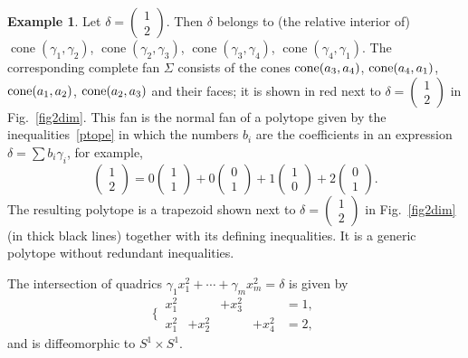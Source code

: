 \documentclass[a4paper]{amsart}
\theoremstyle{definition}
\newtheorem{example}[theorem]{Example}
\theoremstyle{remark}
\numberwithin{equation}{section}
\newcommand{\mb}[1]{{\textbf {\textit#1}}}
\def\cone{\mathop{\mathrm{cone}}}
\newcommand{\<}{\langle}
\renewcommand{\>}{\rangle}
\begin{document}
\begin{example}
Let $\delta=\begin{pmatrix}1\\2\end{pmatrix}$. Then $\delta$ belongs to (the relative interior of) $\cone(\gamma_1,\gamma_2)$, $\cone(\gamma_2,\gamma_3)$, $\cone(\gamma_3,\gamma_4)$, $\cone(\gamma_4,\gamma_1)$. The corresponding complete fan $\Sigma$ consists of the cones $\cone(\mb a_3,\mb a_4)$, $\cone(\mb a_4,\mb a_1)$, $\cone(\mb a_1,\mb a_2)$, $\cone(\mb a_2,\mb a_3)$ and their faces; it is shown in red next to $\delta=\begin{pmatrix}1\\2\end{pmatrix}$ in Fig.~\ref{fig2dim}. This fan is the normal fan of a polytope given by the inequalities~\eqref{ptope} in which the numbers $b_i$ are the coefficients in an expression $\delta=\sum b_i\gamma_i$, for example,
\[
  \begin{pmatrix}1\\2\end{pmatrix}=0\begin{pmatrix}1\\1\end{pmatrix}+
  0\begin{pmatrix}0\\1\end{pmatrix}+1\begin{pmatrix}1\\0\end{pmatrix}+
  2\begin{pmatrix}0\\1\end{pmatrix}.
\] 
The resulting polytope is a trapezoid shown next to $\delta=\begin{pmatrix}1\\2\end{pmatrix}$ in Fig.~\ref{fig2dim} (in thick black lines) together with its defining inequalities. It is a generic polytope without redundant inequalities. 

The intersection of quadrics $\gamma_1x_1^2+\cdots+\gamma_mx_m^2=\delta$ is given by
\[
  \biggl\{\,\begin{aligned}
  x_1^2&&+x_3^2&&=1,\\
  x_1^2&+x_2^2&&+x_4^2&=2,
  \end{aligned}
\]
and is diffeomorphic to $S^1\times S^1$.


\end{example}
\end{document}
